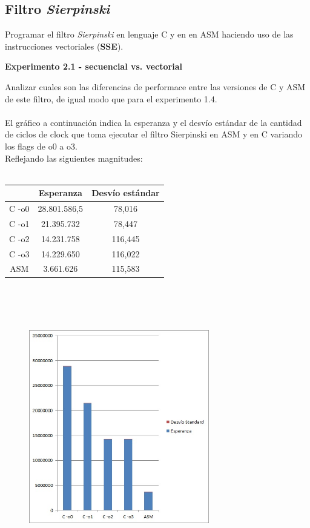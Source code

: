 \subsection{Filtro \textit{Sierpinski}}

Programar el filtro \textit{Sierpinski} en lenguaje C y en en ASM haciendo 
uso de las instrucciones vectoriales (\textbf{SSE}).

\vspace*{0.3cm} \noindent
\textbf{Experimento 2.1 - secuencial vs. vectorial}

Analizar cuales son las diferencias de performace entre las versiones de C 
y ASM de este filtro, de igual modo que para el experimento 1.4. \\
\\
El gr\'afico a continuaci\'on indica la esperanza y el desv\'io est\'andar de la cantidad de ciclos de clock que toma ejecutar el filtro Sierpinski en ASM y en C variando los flags de o0 a o3. \\
Reflejando las siguientes magnitudes: \\
\\
 \begin{tabular}[c]{|c|c|c|}
	\hline
		 & Esperanza & Desv\'io est\'andar\\
		\hline
C -o0 & 28.801.586,5 & 78,016 \\
\hline
C -o1 & 21.395.732 & 78,447 \\
\hline
C -o2 & 14.231.758 & 116,445 \\
\hline
C -o3 & 14.229.650 & 116,022 \\
\hline
ASM & 3.661.626 & 115,583 \\
\hline
	\end{tabular}\\\\
\\

\begin{figure}[h!]
  \begin{center}
	\includegraphics[width=0.7\textwidth]{imagenes/21.jpg}
  \end{center}
\end{figure}

